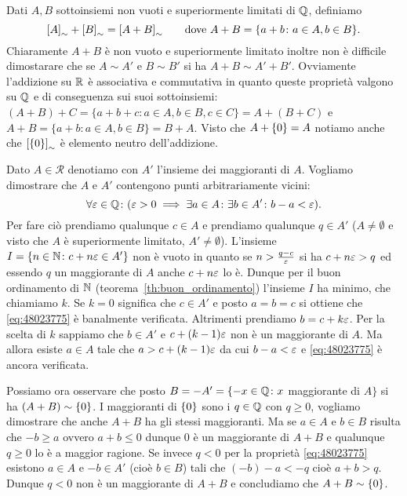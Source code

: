Dati $A,B$ sottoinsiemi non vuoti e superiormente limitati di ${\mathbb Q}$, 
definiamo 
\[
  {\left[ A \right]}_\sim+{\left[ B \right]}_\sim
  = {\left[ A+B \right]}_\sim
  \qquad\text{dove $A+B = {\left\{ a+b\colon a \in A, b \in B \right\}}$.}
\]
Chiaramente $A+B$ è non vuoto e superiormente limitato
inoltre non è difficile dimostarare che 
se $A\sim A'$ e $B\sim B'$ si ha $A+B\sim A'+B'$.
Ovviamente l'addizione su ${\mathbb R}$ è associativa e commutativa in quanto 
queste proprietà valgono su ${\mathbb Q}$ e di conseguenza sui suoi sottoinsiemi:
$(A+B)+C = \{ a+b+c\colon a\in A, b\in B, c\in C\} = A + (B+C)$ e 
$A+B = \{a+b\colon a\in A, b\in B\} = B+A$.
Visto che $A+{\left\{ 0 \right\}} = A$ notiamo anche che ${\left[ {\left\{ 0 \right\}} \right]}_\sim$ 
è elemento neutro dell'addizione.

Dato $A\in \mathcal R$ denotiamo con $A'$ l'insieme dei maggioranti di $A$.
Vogliamo dimostrare che $A$ e $A'$ contengono punti arbitrariamente vicini:
\begin{equation}\label{eq:48023775}
\forall \varepsilon\in{\mathbb Q}\colon (\varepsilon >0 \implies \exists a \in A\colon \exists b\in A'\colon
b-a < \varepsilon).
\end{equation}
Per fare ciò prendiamo qualunque $c\in A$ 
e prendiamo qualunque $q\in A'$ 
($A\neq \emptyset$ e visto che $A$ è superiormente limitato, 
$A'\neq \emptyset$).
L'insieme $I={\left\{ n\in {\mathbb N} \colon c+n\varepsilon\in A' \right\}}$
non è vuoto in quanto se $n>\frac{q-c}{\varepsilon}$ si ha $c+n\varepsilon>q$ ed essendo $q$ 
un maggiorante di $A$ anche $c+n\varepsilon$ lo è.
Dunque per il buon ordinamento di ${\mathbb N}$ (teorema~\ref{th:buon_ordinamento})
l'insieme $I$ ha minimo, che chiamiamo $k$.
Se $k=0$ significa che $c\in A'$ e posto $a=b=c$ si ottiene 
che \eqref{eq:48023775} è banalmente verificata.
Altrimenti prendiamo $b=c+k\varepsilon$.
Per la scelta di $k$ sappiamo che $b\in A'$ e $c+(k-1)\varepsilon$ non è un maggiorante di 
$A$. 
Ma allora esiste $a\in A$ tale che $a>c+(k-1)\varepsilon$ da cui 
$b-a < \varepsilon$ e \eqref{eq:48023775} è ancora verificata.

Possiamo ora osservare che posto $B=-A' = \{-x\in {\mathbb Q} \colon x$ maggiorante di $A\}$
si ha $(A+B)\sim{\left\{ 0 \right\}}$. 
I maggioranti di ${\left\{ 0 \right\}}$ sono i $q\in {\mathbb Q}$ con $q\ge 0$, 
vogliamo dimostrare che anche $A+B$ ha gli stessi maggioranti.
Ma se $a\in A$ e $b\in B$ risulta che $-b\ge a$ ovvero $a+b\le 0$ 
dunque $0$ è un maggiorante di $A+B$ e qualunque $q\ge 0$ lo è a maggior ragione.
Se invece $q<0$ per la proprietà \eqref{eq:48023775} esistono $a\in A$ 
e $-b\in A'$ (cioè $b\in B$) tali che $(-b)-a<-q$ cioè $a+b>q$. Dunque 
$q<0$ non è un maggiorante di $A+B$ e concludiamo che $A+B\sim{\left\{ 0 \right\}}$.

